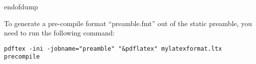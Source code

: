
\csname endofdump\endcsname



\usepackage{verbatim}




\noindent
To generate a pre-compile format ``preamble.fmt'' out of the static preamble, you need to run the
following command:

\begin{verbatim}
pdftex -ini -jobname="preamble" "&pdflatex" mylatexformat.ltx precompile
\end{verbatim}

